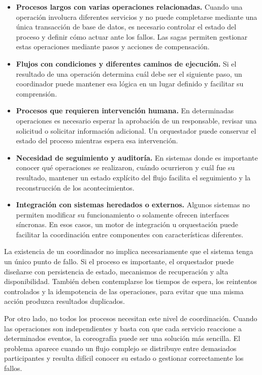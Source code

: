 \begin{itemize}
    \item \textbf{Procesos largos con varias operaciones relacionadas.} Cuando una operación involucra diferentes servicios y no puede completarse mediante una única transacción de base de datos, es necesario controlar el estado del proceso y definir cómo actuar ante los fallos. Las sagas permiten gestionar estas operaciones mediante pasos y acciones de compensación.

    \item \textbf{Flujos con condiciones y diferentes caminos de ejecución.} Si el resultado de una operación determina cuál debe ser el siguiente paso, un coordinador puede mantener esa lógica en un lugar definido y facilitar su comprensión.

    \item \textbf{Procesos que requieren intervención humana.} En determinadas operaciones es necesario esperar la aprobación de un responsable, revisar una solicitud o solicitar información adicional. Un orquestador puede conservar el estado del proceso mientras espera esa intervención.

    \item \textbf{Necesidad de seguimiento y auditoría.} En sistemas donde es importante conocer qué operaciones se realizaron, cuándo ocurrieron y cuál fue su resultado, mantener un estado explícito del flujo facilita el seguimiento y la reconstrucción de los acontecimientos.

    \item \textbf{Integración con sistemas heredados o externos.} Algunos sistemas no permiten modificar su funcionamiento o solamente ofrecen interfaces síncronas. En esos casos, un motor de integración u orquestación puede facilitar la coordinación entre componentes con características diferentes.
\end{itemize}

La existencia de un coordinador no implica necesariamente que el sistema tenga un único punto de fallo. Si el proceso es importante, el orquestador puede diseñarse con persistencia de estado, mecanismos de recuperación y alta disponibilidad. También deben contemplarse los tiempos de espera, los reintentos controlados y la idempotencia de las operaciones, para evitar que una misma acción produzca resultados duplicados.

Por otro lado, no todos los procesos necesitan este nivel de coordinación. Cuando las operaciones son independientes y basta con que cada servicio reaccione a determinados eventos, la coreografía puede ser una solución más sencilla. El problema aparece cuando un flujo complejo se distribuye entre demasiados participantes y resulta difícil conocer su estado o gestionar correctamente los fallos.

